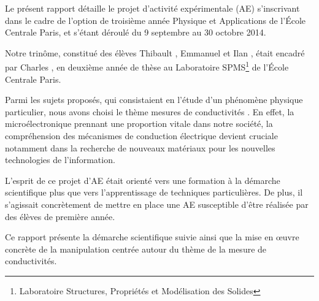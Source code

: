 Le présent rapport détaille le projet d'activité expérimentale (AE) s'inscrivant dans le cadre de l'option de troisième année 
\og Physique et Applications \fg{} de l'École Centrale Paris, et s'étant déroulé du 9 septembre au 30 octobre 2014.

\bigskip
Notre trinôme, constitué des élèves Thibault , Emmanuel  et Ilan , était encadré 
par Charles , en deuxième année de thèse au Laboratoire SPMS\footnote{Laboratoire Structures, 
Propriétés et Modélisation des Solides} de l'École Centrale Paris.

\bigskip
Parmi les sujets proposés, qui consistaient en l'étude d'un phénomène physique particulier, nous avons choisi le thème 
\og mesures de conductivités \fg. En effet, la microélectronique prennant une proportion vitale dans notre société, 
la compréhension des mécanismes de conduction électrique devient cruciale notamment dans 
la recherche de nouveaux matériaux pour les nouvelles technologies de l'information.

\bigskip
L'esprit de ce projet d'AE était orienté vers une formation à la démarche scientifique plus que vers l'apprentissage
de techniques particulières. De plus, il s'agissait concrètement de mettre en place une AE susceptible d'être réalisée
par des élèves de première année.

\bigskip
Ce rapport présente la démarche scientifique suivie ainsi que la mise en \oe uvre concrète de la manipulation
centrée autour du thème de la mesure de conductivités.

